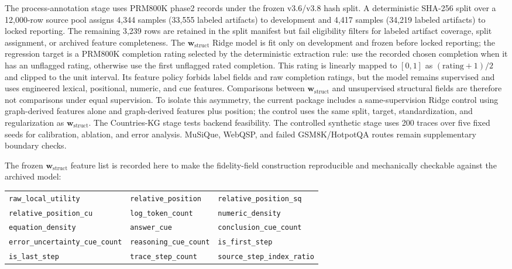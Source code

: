 \documentclass[pdflatex,sn-mathphys-num,iicol]{sn-jnl}
\newcommand{\wstruct}{\ensuremath{\mathbf{w}_{\mathrm{struct}}}}
\begin{document}
The process-annotation stage uses PRM800K phase2 records under the frozen v3.6/v3.8 hash split. A deterministic SHA-256 split over a 12,000-row source pool assigns 4,344 samples (33,555 labeled artifacts) to development and 4,417 samples (34,219 labeled artifacts) to locked reporting. The remaining 3,239 rows are retained in the split manifest but fail eligibility filters for labeled artifact coverage, split assignment, or archived feature completeness. The \wstruct{} Ridge model is fit only on development and frozen before locked reporting; the regression target is a PRM800K completion rating selected by the deterministic extraction rule: use the recorded chosen completion when it has an unflagged rating, otherwise use the first unflagged rated completion. This rating is linearly mapped to $[0,1]$ as $(\mathrm{rating}+1)/2$ and clipped to the unit interval. Its feature policy forbids label fields and raw completion ratings, but the model remains supervised and uses engineered lexical, positional, numeric, and cue features. Comparisons between \wstruct{} and unsupervised structural fields are therefore not comparisons under equal supervision. To isolate this asymmetry, the current package includes a same-supervision Ridge control using graph-derived features alone and graph-derived features plus position; the control uses the same split, target, standardization, and regularization as \wstruct{}. The Countries-KG stage tests backend feasibility. The controlled synthetic stage uses 200 traces over five fixed seeds for calibration, ablation, and error analysis. MuSiQue, WebQSP, and failed GSM8K/HotpotQA routes remain supplementary boundary checks.

The frozen \wstruct{} feature list is recorded here to make the fidelity-field construction reproducible and mechanically checkable against the archived model:
\begin{center}
\scriptsize
\begin{tabular}{lll}
\texttt{raw\_local\_utility} & \texttt{relative\_position} & \texttt{relative\_position\_sq} \\
\texttt{relative\_position\_cu} & \texttt{log\_token\_count} & \texttt{numeric\_density} \\
\texttt{equation\_density} & \texttt{answer\_cue} & \texttt{conclusion\_cue\_count} \\
\texttt{error\_uncertainty\_cue\_count} & \texttt{reasoning\_cue\_count} & \texttt{is\_first\_step} \\
\texttt{is\_last\_step} & \texttt{trace\_step\_count} & \texttt{source\_step\_index\_ratio}
\end{tabular}
\end{center}
\end{document}
